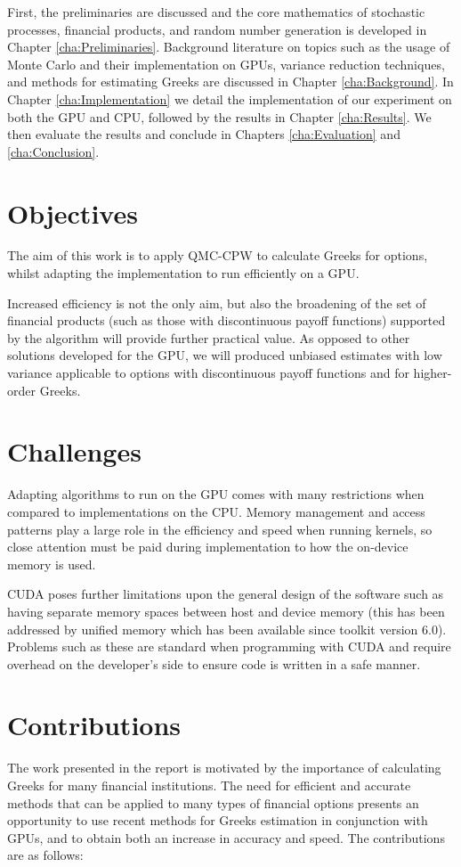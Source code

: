 First, the preliminaries are discussed and the core mathematics of stochastic processes, financial products, and random number generation is developed in Chapter \ref{cha:Preliminaries}. Background literature on topics such as the usage of Monte Carlo and their implementation on GPUs, variance reduction techniques, and methods for estimating Greeks are discussed in Chapter \ref{cha:Background}. In Chapter \ref{cha:Implementation} we detail the implementation of our experiment on both the GPU and CPU, followed by the results in Chapter \ref{cha:Results}. We then evaluate the results and conclude in Chapters \ref{cha:Evaluation} and \ref{cha:Conclusion}.

\section{Objectives}
The aim of this work is to apply QMC-CPW to calculate Greeks for options, whilst adapting the implementation to run efficiently on a GPU.

Increased efficiency is not the only aim, but also the broadening of the set of financial products (such as those with discontinuous payoff functions) supported by the algorithm will provide further practical value. As opposed to other solutions developed for the GPU, we will produced unbiased estimates with low variance applicable to options with discontinuous payoff functions and for higher-order Greeks.

\section{Challenges}
Adapting algorithms to run on the GPU comes with many restrictions when compared to implementations on the CPU. Memory management and access patterns play a large role in the efficiency and speed when running kernels, so close attention must be paid during implementation to how the on-device memory is used.

CUDA poses further limitations upon the general design of the software such as having separate memory spaces between host and device memory (this has been addressed by unified memory which has been available since toolkit version 6.0). Problems such as these are standard when programming with CUDA and require overhead on the developer's side to ensure code is written in a safe manner.

\section{Contributions}
The work presented in the report is motivated by the importance of calculating Greeks for many financial institutions. The need for efficient and accurate methods that can be applied to many types of financial options presents an opportunity to use recent methods for Greeks estimation in conjunction with GPUs, and to obtain both an increase in accuracy and speed. The contributions are as follows:

